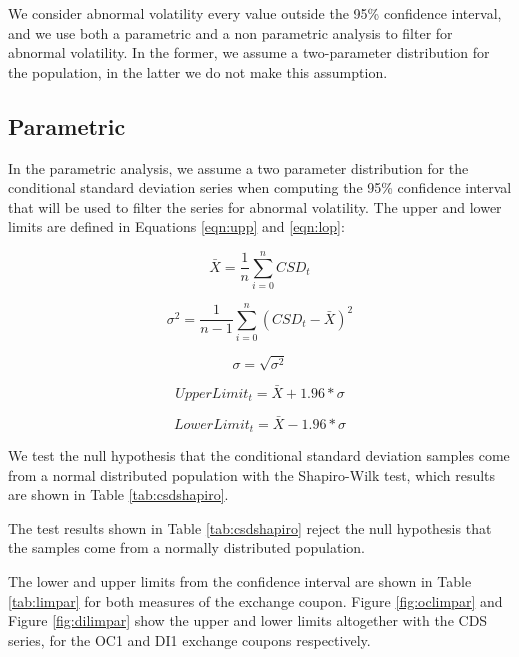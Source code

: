 \documentclass[cic,tc, english]{iiufrgs}
\begin{document}
    

    We consider abnormal volatility every value outside the 95\% confidence interval, and we use both a parametric and a non parametric analysis to filter for abnormal volatility. In the former, we assume a two-parameter distribution for the population, in the latter we do not make this assumption.

\subsection{Parametric}

    In the parametric analysis, we assume a two parameter distribution for the conditional standard deviation series when computing the 95\% confidence interval that will be used to filter the series for abnormal volatility. The upper and lower limits are defined in Equations \ref{eqn:upp} and \ref{eqn:lop}: 

    $$\bar{X} = \frac{1}{n} \displaystyle\sum_{i=0}^{n} CSD_t$$

    $$\sigma^2 = \frac{1}{n-1} \displaystyle\sum_{i=0}^{n} (CSD_t - \bar{X})^2$$

    $$\sigma = \sqrt{\sigma^2}$$

    \begin{equation}
        \label{eqn:upp}
        UpperLimit_t = \bar{X} + 1.96 * \sigma
    \end{equation}

    \begin{equation}
        \label{eqn:lop}
        LowerLimit_t = \bar{X} - 1.96 * \sigma
    \end{equation}

    We test the null hypothesis that the conditional standard deviation samples come from a normal distributed population with the Shapiro-Wilk test, which results are shown in Table \ref{tab:csdshapiro}.

    

    The test results shown in Table \ref{tab:csdshapiro} reject the null hypothesis that the samples come from a normally distributed population.

    The lower and upper limits from the confidence interval are shown in Table \ref{tab:limpar} for both measures of the exchange coupon. Figure \ref{fig:oclimpar} and Figure \ref{fig:dilimpar} show the upper and lower limits altogether with the CDS series, for the OC1 and DI1 exchange coupons respectively.
\end{document}

